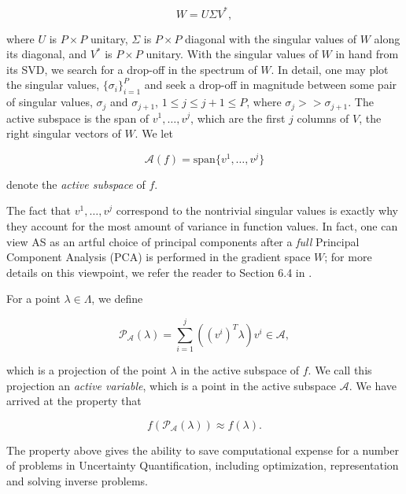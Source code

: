 \documentclass{amsart}
\newcommand{\A}{\mathcal{A}}
\begin{document}
\begin{equation} \label{eq:5}
W=U\Sigma V^*,
\end{equation} 

\noindent where $U$ is $P \times P$ unitary, $\Sigma$ is $P \times P$ diagonal with the singular values of $W$ along its diagonal, and $V^*$ is $P \times P$ unitary. With the singular values of $W$ in hand from its SVD, we search for a drop-off in the spectrum of $W$. In detail, one may plot the singular values, $\{\sigma_i\}_{i=1}^P$ and seek a drop-off in magnitude between some pair of singular values, $\sigma_{j}$ and $\sigma_{j+1}$, $1\leq j \leq j+1 \leq P$, where $\sigma_{j}>>\sigma_{j+1}$. The active subspace is the span of $v^1,\ldots,v^{j}$, which are the first $j$ columns of $V$, the right singular vectors of $W$. We let

\begin{equation} \label{eq:6}
\A(f)=\text{span}\{v^1,\ldots,v^j\}
\end{equation}

\noindent denote the \textit{active subspace} of $f$.


The fact that $v^1,\ldots,v^{j}$ correspond to the nontrivial singular values is exactly why they account for the most amount of variance in function values. In fact, one can view AS as an artful choice of principal components after a \textit{full} Principal Component Analysis (PCA) is performed in the gradient space $W$; for more details on this viewpoint, we refer the reader to Section 6.4 in \cite{Russi}.

For a point $\lambda \in \Lambda$, we define

\begin{equation} \label{eq:7}
  \mathcal{P}_\A(\lambda)=\sum_{i=1}^{j}\left( ({v^i})^T \lambda\right)v^i \in \A, 
\end{equation}

\noindent which is a projection of the point $\lambda$ in the active subspace of $f$. We call this projection an \textit{active variable}, which is a point in the active subspace $\A$. We have arrived at the property that 

\begin{equation} \label{eq:8}
f\left(\mathcal{P}_\A(\lambda)\right) \approx f(\lambda).
\end{equation}

The property above gives the ability to save computational expense for a number of problems in Uncertainty Quantification, including optimization, representation and solving inverse problems. 
\end{document}
